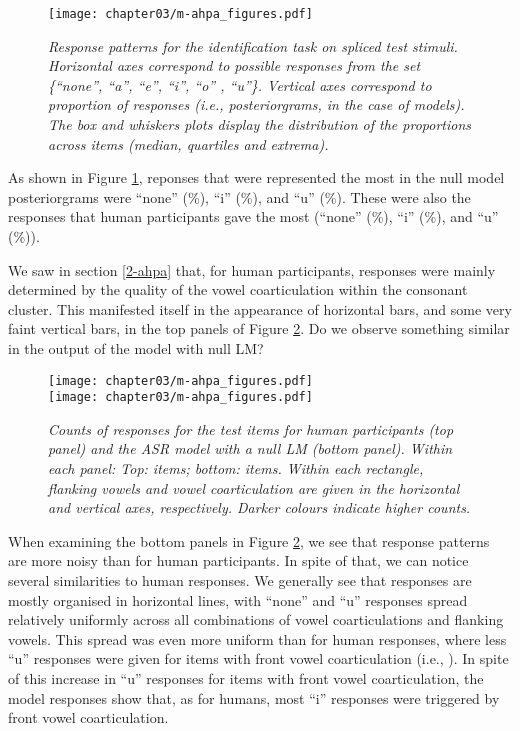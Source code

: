 {\begin{figure}[htb!]
\centering
\texttt{[image: chapter03/m-ahpa\_figures.pdf]}
\caption{\textit{Response patterns for the identification task on spliced test stimuli. Horizontal axes correspond to possible responses from the set \{``none'', ``a'', ``e'', ``i'', ``o'' , ``u''\}. Vertical axes correspond to proportion of responses (i.e., posteriorgrams, in the case of models). The box and whiskers plots display the distribution of the proportions across items (median, quartiles and extrema).}}
\label{fig:m-ahpa_test_coll}
\end{figure}

As shown in Figure \ref{fig:m-ahpa_test_coll}, reponses that were represented the most in the null model posteriorgrams were {\color{red}``none'' (\%), ``i'' (\%), and ``u'' (\%)}. These were also the responses that human participants gave the most {\color{red}(``none'' (\%), ``i'' (\%), and ``u'' (\%))}.

We saw in section \ref{2-ahpa} that, for human participants, responses were mainly determined by the quality of the vowel coarticulation within the consonant cluster. This manifested itself in the appearance of horizontal bars, and some very faint vertical bars, in the top panels of Figure \ref{fig:m-ahpa_test_heat}. Do we observe something similar in the output of the model with null LM?

\begin{figure}[htb!]
\centering
\texttt{[image: chapter03/m-ahpa\_figures.pdf]} \\ \vspace{0.5cm}
\texttt{[image: chapter03/m-ahpa\_figures.pdf]}
\caption{\textit{Counts of responses for the test items for human participants (top panel) and the ASR model with a null LM (bottom panel). Within each panel: Top: items; bottom: items. Within each rectangle, flanking vowels and vowel coarticulation are given in the horizontal and vertical axes, respectively. Darker colours indicate higher counts.}}
\label{fig:m-ahpa_test_heat}
\end{figure}

When examining the bottom panels in Figure \ref{fig:m-ahpa_test_heat}, we see that response patterns are more noisy than for human participants. In spite of that, we can notice several similarities to human responses.
We generally see that responses are mostly organised in horizontal lines, with ``none'' and ``u'' responses spread relatively uniformly across all combinations of vowel coarticulations and flanking vowels. This spread was even more uniform than for human responses, where less ``u'' responses were given for items with front vowel coarticulation (i.e., \textipa{[i, e]}). In spite of this increase in ``u'' responses for items with front vowel coarticulation, the model responses show that, as for humans, most ``i'' responses were triggered by front vowel coarticulation.

}
